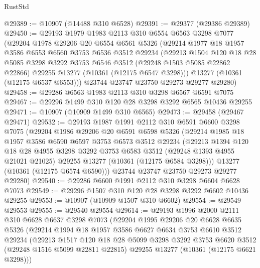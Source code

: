 \begin{lexlean}{RustStd}
\begin{coremodule}
@29389 := @10907 (@14488 @310 @6528)
@29391 := @29377 (@29386 @29389)
@29450 := @29193
    @1979
    @1983
    @2113
    @310
    @6554
    @6563
    @3298
    @7077
    (@29204
      @1978
      @29206
      @20
      @6554
      @6561
      @5326
      (@29214
        @1977
        @18
        @1957
        @3586
        @6553
        @6560
        @3753
        @6536
        @3512
        @29234
        (@29213
          @1504
          @120
          @18
          @28
          @5085
          @3298
          @3292
          @3753
          @6546
          @3512
          (@29248 @1503 @5085 @22862 @22866)
          @29255
          @13277
          (@10361 (@12175 @6547 @3298)))
        @13277
        (@10361 (@12175 @6537 @6553)))
      @23744
      @23747
      @23750
      @29273
      @29277
      @29280)
@29458 := @29286 @6563 @1983 @2113 @310 @3298 @6567 @6591 @7075
@29467 := @29296 @1499 @310 @120 @28 @3298 @3292 @6565 @10436 @29255
@29471 := @10907 (@10909 @1499 @310 @6565)
@29473 := @29458 (@29467 @29471)
@29532 := @29193
    @1987
    @1991
    @2112
    @310
    @6591
    @6600
    @3298
    @7075
    (@29204
      @1986
      @29206
      @20
      @6591
      @6598
      @5326
      (@29214
        @1985
        @18
        @1957
        @3586
        @6590
        @6597
        @3753
        @6573
        @3512
        @29234
        (@29213
          @1394
          @120
          @18
          @28
          @4955
          @3298
          @3292
          @3753
          @6583
          @3512
          (@29248 @1393 @4955 @21021 @21025)
          @29255
          @13277
          (@10361 (@12175 @6584 @3298)))
        @13277
        (@10361 (@12175 @6574 @6590)))
      @23744
      @23747
      @23750
      @29273
      @29277
      @29280)
@29540 := @29286 @6600 @1991 @2112 @310 @3298 @6604 @6628 @7073
@29549 := @29296 @1507 @310 @120 @28 @3298 @3292 @6602 @10436 @29255
@29553 := @10907 (@10909 @1507 @310 @6602)
@29554 := @29549 @29553
@29555 := @29540 @29554
@29614 := @29193
    @1996
    @2000
    @2111
    @310
    @6628
    @6637
    @3298
    @7073
    (@29204
      @1995
      @29206
      @20
      @6628
      @6635
      @5326
      (@29214
        @1994
        @18
        @1957
        @3586
        @6627
        @6634
        @3753
        @6610
        @3512
        @29234
        (@29213
          @1517
          @120
          @18
          @28
          @5099
          @3298
          @3292
          @3753
          @6620
          @3512
          (@29248 @1516 @5099 @22811 @22815)
          @29255
          @13277
          (@10361 (@12175 @6621 @3298)))

\end{coremodule}
\end{lexlean}

